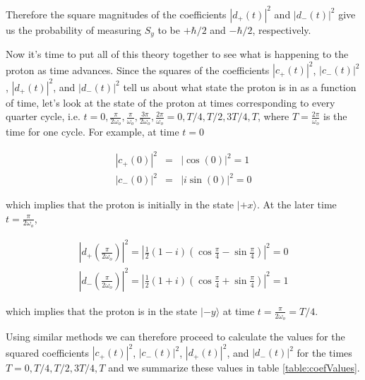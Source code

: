 \noindent Therefore the square magnitudes of the coefficients $|d_+(t)|^2$ and $|d_-(t)|^2$
give us the probability of measuring $S_y$ to be $+\hbar /2$ and $-\hbar /2$, respectively.

Now it's time to put all of this theory together to see what is happening to the proton as time advances.  Since the squares of the coefficients $|c_+(t)|^2$, $|c_-(t)|^2$, $|d_+(t)|^2$, and $|d_-(t)|^2$ tell us about what state the proton is in as a function of time, let's look at the state of the proton at times corresponding to every quarter cycle, i.e. $t = 0, \frac{\pi}{2 \omega_o}, \frac{\pi}{\omega_o}, \frac{3\pi}{2 \omega_o}, \frac{2\pi}{\omega_o} = 0, T/4, T/2, 3T/4, T$, where $T = \frac{2\pi}{\omega_o}$ is the time for one cycle.  For example, at time $t=0$

\begin{eqnarray}
|c_+(0)|^2 & = & \left| \cos{(0)} \right|^2 = 1 \nonumber \\
|c_-(0)|^2 & = & \left| i \sin{(0)} \right|^2 = 0 \nonumber
\end{eqnarray}

\noindent which implies that the proton is initially in the state $|\mbox{$+x$}\rangle$.  At the later time $t = \frac{\pi}{2 \omega_o}$, 

\begin{eqnarray}
|d_+(\frac{\pi}{2 \omega_o})|^2 = \left| \frac{1}{2}(1-i)\left(\cos{\frac{\pi}{4}}-\sin{\frac{\pi}{4}}\right) \right|^2 = 0 \nonumber \\
|d_-(\frac{\pi}{2 \omega_o})|^2 = \left| \frac{1}{2} (1+i) \left(\cos{\frac{\pi}{4}} + \sin{\frac{\pi}{4}} \right) \right|^2 = 1 \nonumber
\end{eqnarray}

\noindent which implies that the proton is in the state $|\mbox{$-y$}\rangle$ at time $t = \frac{\pi}{2 \omega_o} = T/4$. 

Using similar methods we can therefore proceed to calculate the values for the squared coefficients $|c_+(t)|^2$, $|c_-(t)|^2$, $|d_+(t)|^2$, and $|d_-(t)|^2$ for the times $T = 0, T/4, T/2, 3T/4, T$ and we summarize these values in table \ref{table:coefValues}.


